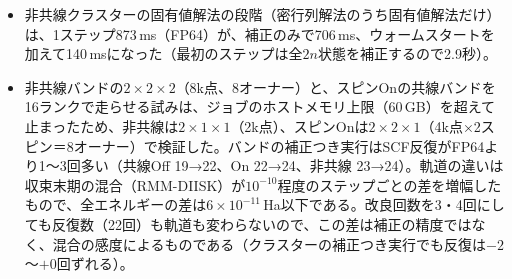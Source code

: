 \documentclass[a4paper,11pt]{ltjsarticle}
\newcommand{\E}[1]{\times10^{#1}}
\begin{document}
\medskip
\begin{itemize}
\item 非共線クラスターの固有値解法の段階（密行列解法のうち固有値解法だけ）は、1ステップ873\,ms（FP64）が、補正のみで706\,ms、ウォームスタートを加えて140\,msになった（最初のステップは全$2n$状態を補正するので2.9秒）。
\item 非共線バンドの$2\times2\times2$（8k点、8オーナー）と、スピンOnの共線バンドを16ランクで走らせる試みは、ジョブのホストメモリ上限（60\,GB）を超えて止まったため、非共線は$2\times1\times1$（2k点）、スピンOnは$2\times2\times1$（4k点×2スピン＝8オーナー）で検証した。バンドの補正つき実行はSCF反復がFP64より1〜3回多い（共線Off 19→22、On 22→24、非共線 23→24）。軌道の違いは収束末期の混合（RMM-DIISK）が$10^{-10}$程度のステップごとの差を増幅したもので、全エネルギーの差は$6\E{-11}$\,Ha以下である。改良回数を3・4回にしても反復数（22回）も軌道も変わらないので、この差は補正の精度ではなく、混合の感度によるものである（クラスターの補正つき実行でも反復は$-2$〜$+0$回ずれる）。

\end{itemize}
\end{document}
